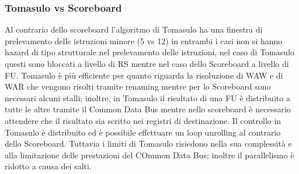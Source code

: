 \subsubsection{Tomasulo vs Scoreboard}
Al contrario dello scoreboard l'algoritmo di Tomasulo ha una finestra di prelevamento delle istruzioni minore (5 vs 12) in entrambi i casi non si hanno hazard di tipo strutturale nel prelevamento delle istruzioni, nel caso di Tomasulo questi sono bloccati a livello di RS mentre nel caso dello Scoreboard a livello di FU. Tomasulo è più efficiente per quanto riguarda la risoluzione di WAW e di WAR che vengono risolti tramite renaming mentre per lo Scoreboard sono necessari alcuni stalli; inoltre, in Tomasulo il risultato di una FU è distribuito a tutte le altre tramite il Common Data Bus mentre nello scoreboard è necessario attendere che il risultato sia scritto nei registri di destinazione. Il controllo in Tomasulo è distribuito ed è possibile effettuare un loop unrolling al contrario dello Scoreboard. Tuttavia i limiti di Tomasulo risiedono nella sua complessità e alla limitazione delle prestazioni del COmmon Data Bus; inoltre il parallelismo è ridotto a causa dei salti.